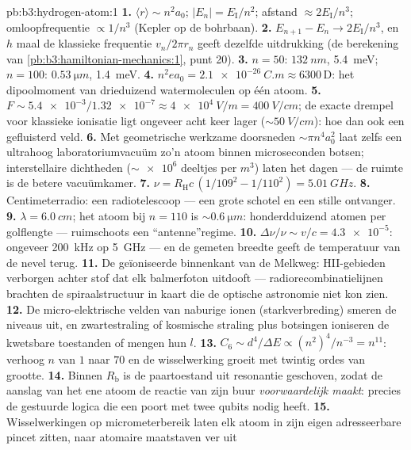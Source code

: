 \begin{solution}{pb:b3:hydrogen-atom:1}
\textbf{1.} $\langle r\rangle \sim n^2a_0$; $|E_n| =
E_{\text{I}}/n^2$; afstand $\approx 2E_{\text{I}}/n^3$;
omloopfrequentie $\propto 1/n^3$ (Kepler op de bohrbaan).
\textbf{2.} $E_{n+1} - E_n \to 2E_{\text{I}}/n^3$, en $h$ maal de
klassieke frequentie $v_n/2\pi r_n$ geeft dezelfde uitdrukking (de
berekening van \cref{pb:b3:hamiltonian-mechanics:1}, punt 20).
\textbf{3.} $n = 50$: $\qty{132}{nm}$, \qty{5.4}{meV}; $n = 100$:
$\qty{0.53}{\micro m}$, \qty{1.4}{meV}.
\textbf{4.} $n^2ea_0 = \qty{2.1e-26}{C.m} \approx 6300\,\text{D}$:
het dipoolmoment van drieduizend watermoleculen op één atoom.
\textbf{5.} $F \sim \num{5.4e-3}/\num{1.32e-7} \approx
\qty{4e4}{V/m} = \qty{400}{V/cm}$; de exacte drempel voor klassieke
ionisatie ligt ongeveer acht keer lager ($\sim\qty{50}{V/cm}$): hoe dan
ook een gefluisterd veld.
\textbf{6.} Met geometrische werkzame doorsneden $\sim\pi n^4a_0^2$ laat
zelfs een ultrahoog laboratoriumvacuüm zo'n atoom binnen microseconden
botsen; interstellaire dichtheden ($\sim\num{e6}$ deeltjes per
$\unit{m^3}$) laten het dagen --- de ruimte is de betere vacuümkamer.
\textbf{7.} $\nu = R_{\text{H}}c\,(1/109^2 - 1/110^2) =
\qty{5.01}{GHz}$.
\textbf{8.} Centimeterradio: een radiotelescoop --- een grote schotel en
een stille ontvanger.
\textbf{9.} $\lambda = \qty{6.0}{cm}$; het atoom bij $n = 110$ is
$\sim\qty{0.6}{\micro m}$: honderdduizend atomen per golflengte ---
ruimschoots een ``antenne''regime.
\textbf{10.} $\Delta\nu/\nu \sim v/c = \num{4.3e-5}$: ongeveer
\qty{200}{kHz} op \qty{5}{GHz} --- en de gemeten breedte geeft de
temperatuur van de nevel terug.
\textbf{11.} De geïoniseerde binnenkant van de Melkweg: HII-gebieden
verborgen achter stof dat elk balmerfoton uitdooft ---
radiorecombinatielijnen brachten de spiraalstructuur in kaart die de
optische astronomie niet kon zien.
\textbf{12.} De micro-elektrische velden van naburige ionen
(starkverbreding) smeren de niveaus uit, en zwartestraling of kosmische
straling plus botsingen ioniseren de kwetsbare toestanden of mengen hun
$l$.
\textbf{13.} $C_6 \sim d^4/\Delta E \propto (n^2)^4/n^{-3} =
n^{11}$: verhoog $n$ van $1$ naar $70$ en de wisselwerking groeit met
twintig ordes van grootte.
\textbf{14.} Binnen $R_{\text{b}}$ is de paartoestand uit resonantie
geschoven, zodat de aanslag van het ene atoom de reactie van zijn buur
\emph{voorwaardelijk maakt}: precies de gestuurde logica die een poort
met twee qubits nodig heeft.
\textbf{15.} Wisselwerkingen op micrometerbereik laten elk atoom in zijn
eigen adresseerbare pincet zitten, naar atomaire maatstaven ver uit

\end{solution}
